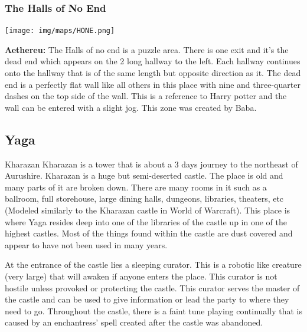 \subsubsection{The Halls of No End}
\begin{center}
	\texttt{[image: img/maps/HONE.png]} 
	
	{\textbf{Aethereu:} The Halls of no end is a puzzle area. There is one exit and it's the dead end which appears on the 2 long hallway to the left. Each hallway continues onto the hallway that is of the same length but opposite direction as it. The dead end is a perfectly flat wall like all others in this place with nine and three-quarter dashes on the top side of the wall. This is a reference to Harry potter and the wall can be entered with a slight jog. This zone was created by Baba.}
\end{center}

\subsection{Yaga}

\begin{commentbox}{Kharazan}
	Kharazan is a tower that is about a 3 days journey to the northeast of Aurushire. Kharazan is a huge but semi-deserted castle. The place is old and many parts of it are broken down. There are many rooms in it such as a ballroom, full storehouse, large dining halls, dungeons, libraries, theaters, etc (Modeled similarly to the Kharazan castle in World of Warcraft). This place is where Yaga resides deep into one of the libraries of the castle up in one of the highest castles. Most of the things found within the castle are dust covered and appear to have not been used in many years.
	
	At the entrance of the castle lies a sleeping curator. This is a robotic like creature (very large) that will awaken if anyone enters the place. This curator is not hostile unless provoked or protecting the castle. This curator serves the master of the castle and can be used to give information or lead the party to where they need to go. Throughout the castle, there is a faint tune playing continually that is caused by an enchantress' spell created after the castle was abandoned.
\end{commentbox}

